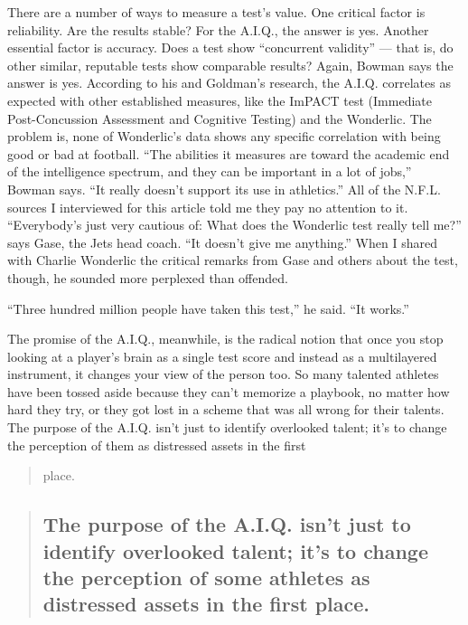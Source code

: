 There are a number of ways to measure a test's value. One critical
factor is reliability. Are the results stable? For the A.I.Q., the
answer is yes. Another essential factor is accuracy. Does a test show
``concurrent validity'' --- that is, do other similar, reputable tests
show comparable results? Again, Bowman says the answer is yes. According
to his and Goldman's research, the A.I.Q. correlates as expected with
other established measures, like the ImPACT test (Immediate
Post-Concussion Assessment and Cognitive Testing) and the Wonderlic. The
problem is, none of Wonderlic's data shows any specific correlation with
being good or bad at football. ``The abilities it measures are toward
the academic end of the intelligence spectrum, and they can be important
in a lot of jobs,'' Bowman says. ``It really doesn't support its use in
athletics.'' All of the N.F.L. sources I interviewed for this article
told me they pay no attention to it. ``Everybody's just very cautious
of: What does the Wonderlic test really tell me?'' says Gase, the Jets
head coach. ``It doesn't give me anything.'' When I shared with Charlie
Wonderlic the critical remarks from Gase and others about the test,
though, he sounded more perplexed than offended.

``Three hundred million people have taken this test,'' he said. ``It
works.''

The promise of the A.I.Q., meanwhile, is the radical notion that once
you stop looking at a player's brain as a single test score and instead
as a multilayered instrument, it changes your view of the person too. So
many talented athletes have been tossed aside because they can't
memorize a playbook, no matter how hard they try, or they got lost in a
scheme that was all wrong for their talents. The purpose of the A.I.Q.
isn't just to identify overlooked talent; it's to change the perception
of them as distressed assets in the first

\begin{quote}
place.
\end{quote}

\begin{quote}
\hypertarget{the-purpose-of-the-aiq-isnt-just-to-identify-overlooked-talent-its-to-change-the-perception-of-some-athletes-as-distressed-assets-in-the-first-place}{%
\subsection{The purpose of the A.I.Q. isn't just to identify overlooked
talent; it's to change the perception of some athletes as distressed
assets in the first
place.}\label{the-purpose-of-the-aiq-isnt-just-to-identify-overlooked-talent-its-to-change-the-perception-of-some-athletes-as-distressed-assets-in-the-first-place}}
\end{quote}

